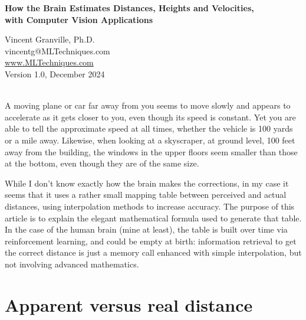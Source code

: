 \documentclass[10pt]{article}
\begin{document}
\hypersetup{linkcolor=blue}


\begin{center}
{\Large \bf{How the Brain Estimates Distances, Heights and Velocities,\\
\vspace{1.0ex} with Computer Vision Applications} 
}  \\
\addvspace{5ex}
\end{center}
 
\begin{center}
Vincent Granville, Ph.D. \\
 vincentg@MLTechniques.com\\
 \href{https://mltechniques.com/}{www.MLTechniques.com}\\
\quad 
Version 1.0, December 2024  \\ \quad \vspace{4ex}\\
\end{center}

\hypersetup{linkcolor=red}

A moving plane or car far away from you seems to move slowly and appears to accelerate as it gets closer to you, even though its
speed is constant. Yet you are able to tell the approximate speed at all times, whether the vehicle is 100 yards or a mile away. Likewise, when looking at a skyscraper, at ground level, 100 feet away from the building, the windows in the upper floors seem smaller than those at the bottom, even though they are of the same size. 

While I don't know exactly how the brain makes the corrections, in my case it seems that it uses a rather small mapping table between perceived and actual distances, using interpolation methods to increase accuracy. The purpose of this article is to explain the elegant mathematical formula used to generate that table. In the case of the human brain (mine at least), the table is built over time via reinforcement learning, and could be empty at birth: 
information retrieval to get the correct distance is just a memory call enhanced with simple interpolation, but not involving advanced mathematics. 

\section{Apparent versus real distance}
\end{document}
